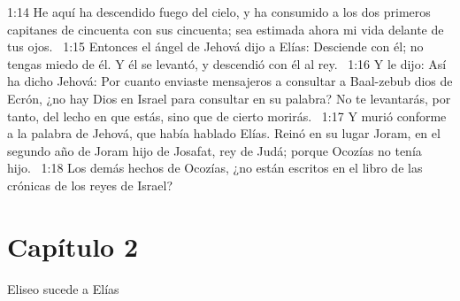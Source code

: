 1:14 He aquí ha descendido fuego del cielo, y ha consumido a los dos primeros capitanes de cincuenta con sus cincuenta; sea estimada ahora mi vida delante de tus ojos.  
1:15 Entonces el ángel de Jehová dijo a Elías: Desciende con él; no tengas miedo de él. Y él se levantó, y descendió con él al rey.  
1:16 Y le dijo: Así ha dicho Jehová: Por cuanto enviaste mensajeros a consultar a Baal-zebub dios de Ecrón, ¿no hay Dios en Israel para consultar en su palabra? No te levantarás, por tanto, del lecho en que estás, sino que de cierto morirás.  
1:17 Y murió conforme a la palabra de Jehová, que había hablado Elías. Reinó en su lugar Joram, en el segundo año de Joram hijo de Josafat, rey de Judá; porque Ocozías no tenía hijo.  
1:18 Los demás hechos de Ocozías, ¿no están escritos en el libro de las crónicas de los reyes de Israel?  
\section*{Capítulo 2}
Eliseo sucede a Elías  

